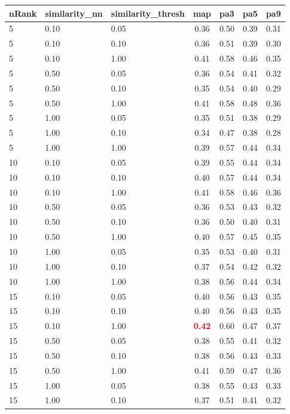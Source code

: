   
\begin{table} 
\begin{center} 
\scriptsize 
 \setlength{\tabcolsep}{.16667em} 
\begin{tabular}{lllcccc} 
nRank & similarity\_nn & similarity\_thresh & map & pa3 & pa5 & pa9 \\ 
\hline 
 5 & 0.10 & 0.05 & 0.36 & 0.50 & 0.39 & 0.31 \\ 
 5 & 0.10 & 0.10 & 0.36 & 0.51 & 0.39 & 0.30 \\ 
 5 & 0.10 & 1.00 & 0.41 & 0.58 & 0.46 & 0.35 \\ 
 5 & 0.50 & 0.05 & 0.36 & 0.54 & 0.41 & 0.32 \\ 
 5 & 0.50 & 0.10 & 0.35 & 0.54 & 0.40 & 0.29 \\ 
 5 & 0.50 & 1.00 & 0.41 & 0.58 & 0.48 & 0.36 \\ 
 5 & 1.00 & 0.05 & 0.35 & 0.51 & 0.38 & 0.29 \\ 
 5 & 1.00 & 0.10 & 0.34 & 0.47 & 0.38 & 0.28 \\ 
 5 & 1.00 & 1.00 & 0.39 & 0.57 & 0.44 & 0.34 \\ 
10 & 0.10 & 0.05 & 0.39 & 0.55 & 0.44 & 0.34 \\ 
10 & 0.10 & 0.10 & 0.40 & 0.57 & 0.44 & 0.34 \\ 
10 & 0.10 & 1.00 & 0.41 & 0.58 & 0.46 & 0.36 \\ 
10 & 0.50 & 0.05 & 0.36 & 0.53 & 0.43 & 0.32 \\ 
10 & 0.50 & 0.10 & 0.36 & 0.50 & 0.40 & 0.31 \\ 
10 & 0.50 & 1.00 & 0.40 & 0.57 & 0.45 & 0.35 \\ 
10 & 1.00 & 0.05 & 0.35 & 0.53 & 0.40 & 0.31 \\ 
10 & 1.00 & 0.10 & 0.37 & 0.54 & 0.42 & 0.32 \\ 
10 & 1.00 & 1.00 & 0.38 & 0.56 & 0.44 & 0.34 \\ 
15 & 0.10 & 0.05 & 0.40 & 0.56 & 0.43 & 0.35 \\ 
15 & 0.10 & 0.10 & 0.40 & 0.56 & 0.43 & 0.35 \\ 
15 & 0.10 & 1.00 & \textbf{\textcolor{red}{0.42}} & 0.60 & 0.47 & 0.37 \\ 
15 & 0.50 & 0.05 & 0.38 & 0.55 & 0.41 & 0.32 \\ 
15 & 0.50 & 0.10 & 0.38 & 0.56 & 0.43 & 0.33 \\ 
15 & 0.50 & 1.00 & 0.41 & 0.59 & 0.47 & 0.36 \\ 
15 & 1.00 & 0.05 & 0.38 & 0.55 & 0.43 & 0.33 \\ 
15 & 1.00 & 0.10 & 0.37 & 0.51 & 0.41 & 0.32 \\ 

\end{tabular}
\end{center}
\end{table}
